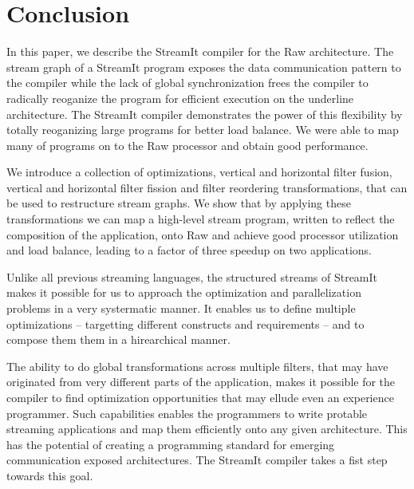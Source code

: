 \section{Conclusion}
\label{sec:conclusion}

In this paper, we describe the StreamIt compiler for the Raw
architecture.  The stream graph of a StreamIt program exposes the data
communication pattern to the compiler while the lack of global
synchronization frees the compiler to radically reoganize the program
for efficient execution on the underline architecture. The StreamIt
compiler demonstrates the power of this flexibility by totally
reoganizing large programs for better load balance. We were able to
map many of programs on to the Raw processor and obtain good
performance.

We introduce a collection of optimizations, vertical and horizontal
filter fusion, vertical and horizontal filter fission and filter
reordering transformations, that can be used to restructure stream
graphs.  We show that by applying these transformations we can map a
high-level stream program, written to reflect the composition of the
application, onto Raw and achieve good processor utilization and load
balance, leading to a factor of three speedup on two applications.

Unlike all previous streaming languages, the structured streams of
StreamIt makes it possible for us to approach the optimization and
parallelization problems in a very systermatic manner. It enables us
to define multiple optimizations -- targetting different constructs
and requirements -- and to compose them them in a hirearchical manner.

The ability to do global transformations across multiple filters, that
may have originated from very different parts of the application,
makes it possible for the compiler to find optimization opportunities
that may ellude even an experience programmer.  Such capabilities
enables the programmers to write protable streaming applications and
map them efficiently onto any given architecture. This has the
potential of creating a programming standard for emerging
communication exposed architectures.  The StreamIt compiler takes a
fist step towards this goal.

